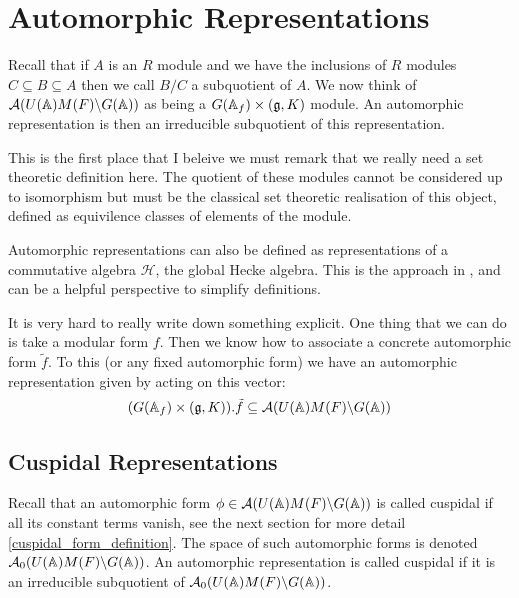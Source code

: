 \section{Automorphic Representations}
Recall that if \(A\) is an \(R\) module and we have the inclusions of \(R\) modules \(C \subseteq B \subseteq A\) then we call \(B/C\) a subquotient of \(A\). We now think of \(\mathcal{A}(U(\A)M(F)\backslash G(\A))\) as being a \(G(\A_f)\times (\mathfrak{g}, K)\) module. An automorphic representation is then an irreducible subquotient of this representation.
\begin{remark}
    This is the first place that I beleive we must remark that we really need a set theoretic definition here. The quotient of these modules cannot be considered up to isomorphism but must be the classical set theoretic realisation of this object, defined as equivilence classes of elements of the module.
\end{remark}

\begin{remark}
    Automorphic representations can also be defined as representations of a commutative algebra \(\mathcal{H}\), the global Hecke algebra. This is the approach in \cite[I.II(4.6)]{borelAutomorphicFormsRepresentations1979}, and can be a helpful perspective to simplify definitions. 
\end{remark}

\begin{example}
    It is very hard to really write down something explicit. One thing that we can do is take a modular form \(f\). Then we know how to associate a concrete automorphic form \(\tilde{f}\). To this (or any fixed automorphic form) we have an automorphic representation given by acting on this vector:
    \[(G(\A_f)\times (\mathfrak{g}, K)).\tilde{f} \subseteq \mathcal{A}(U(\A)M(F)\backslash G(\A))\]
\end{example}

\subsection{Cuspidal Representations}
Recall that an automorphic form \(\phi\in \mathcal{A}(U(\A)M(F) \backslash G(\A))\) is called cuspidal  if all its constant terms vanish, see the next section for more detail \ref{cuspidal_form_definition}.
The space of such automorphic forms is denoted \(\mathcal{A}_0(U(\A)M(F) \backslash G(\A))\). An automorphic representation is called cuspidal if it is an irreducible subquotient of \(\mathcal{A}_0(U(\A)M(F) \backslash G(\A))\).

